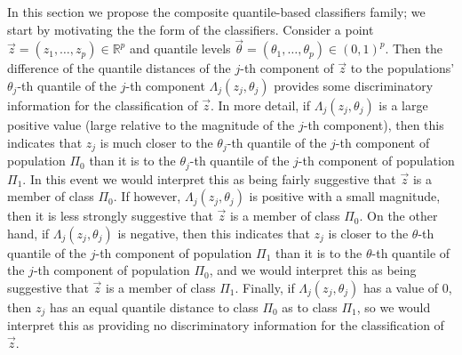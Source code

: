 In this section we propose the composite quantile-based classifiers
family; we start by motivating the the form of the classifiers.  Consider a
point $\vec{z} = (z_1, \dots, z_p) \in \mathbb{R}^p$ and quantile levels
$\vec{\theta} = (\theta_1, \dots, \theta_p) \in (0, 1)^p$.  Then the difference
of the quantile distances of the $j$-th component of $\vec{z}$ to the
populations' $\theta_j$-th quantile of the $j$-th component
$\Lambda_j(z_j, \theta_j)$ provides some discriminatory information for the
classification of $\vec{z}$.  In more detail, if $\Lambda_j(z_j, \theta_j)$ is a
large positive value (large relative to the magnitude of the $j$-th component),
then this indicates that $z_j$ is much closer to the $\theta_j$-th quantile of
the $j$-th component of population $\Pi_0$ than it is to the $\theta_j$-th
quantile of the $j$-th component of population $\Pi_1$.  In this event we would
interpret this as being fairly suggestive that $\vec{z}$ is a member of class
$\Pi_0$.  If however, $\Lambda_j(z_j, \theta_j)$ is positive with a small
magnitude, then it is less strongly suggestive that $\vec{z}$ is a member of
class $\Pi_0$.  On the other hand, if $\Lambda_j(z_j, \theta_j)$ is negative,
then this indicates that $z_j$ is closer to the $\theta$-th quantile of the
$j$-th component of population $\Pi_1$ than it is to the $\theta$-th quantile of
the $j$-th component of population $\Pi_0$, and we would interpret this as being
suggestive that $\vec{z}$ is a member of class $\Pi_1$.  Finally, if
$\Lambda_j(z_j, \theta_j)$ has a value of 0, then $z_j$ has an equal quantile
distance to class $\Pi_0$ as to class $\Pi_1$, so we would interpret this as
providing no discriminatory information for the classification of $\vec{z}$.


